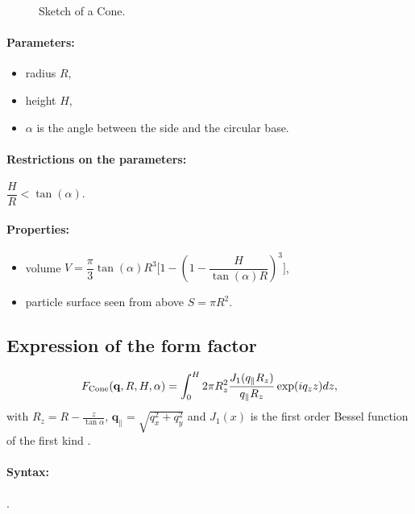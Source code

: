 \begin{figure}[ht]
\begin{center}
\caption{Sketch of a Cone.}
\end{center}
\label{cone}
\end{figure}

\paragraph{Parameters:}
\begin{itemize}
\item radius $R$,
\item height $H$,
\item $\alpha$ is the angle between the side and the circular base.
\end{itemize}

\paragraph{Restrictions on the parameters:} $\dfrac{H}{R}< \tan(\alpha)$.

\paragraph{Properties:}
\begin{itemize}
\item volume $V = \dfrac{\pi}{3} \tan(\alpha) R^3 \Big[ 
            1 - (1- \dfrac{H}{\tan(\alpha)R})^3\Big]$,
\item  particle surface seen from above $S=\pi R^2$.
\end{itemize}

\subsection{Expression of the form factor}
\begin{equation*}
F_{\rm{Cone}}(\mathbf{q}, R, H, \alpha) = \int_0 ^H 2\pi R_z^2
\frac{J_1(q_{\parallel}R_z)}{q_{\parallel} R_z}\exp(iq_z z)dz,
\end{equation*}
with $R_z =R-\frac{z}{\tan \alpha}$, $\mathbf{q}_{\parallel}=\sqrt{q_x^2+ q_y^2}$ and $J_1(x)$ is the first order
Bessel function of the first kind \cite{AbSt64}.

\paragraph{Syntax:}  . 

